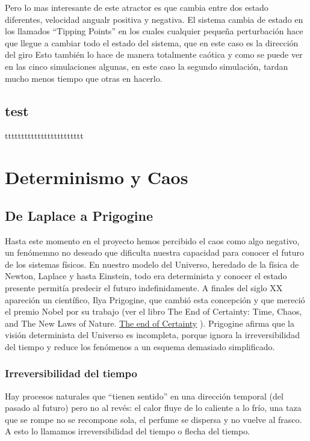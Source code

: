 \documentclass[
  11pt,
  a4paper,
  DIV=11,
  numbers=noendperiod]{scrreprt}
\begin{document}
Pero lo mas interesante de este atractor es que cambia entre dos estado
diferentes, velocidad angualr positiva y negativa. El sistema cambia de
estado en los llamados ``Tipping Points'' en los cuales cualquier
pequeña perturbación hace que llegue a cambiar todo el estado del
sistema, que en este caso es la dirección del giro Esto también lo hace
de manera totalmente caótica y como se puede ver en las cinco
simulaciones algunas, en este caso la segundo simulación, tardan mucho
menos tiempo que otras en hacerlo.

\chapter{test}\label{test}

tttttttttttttttttttttttt

\part{Determinismo y Caos}

\chapter{De Laplace a Prigogine}\label{de-laplace-a-prigogine}

Hasta este momento en el proyecto hemos percibido el caos como algo
negativo, un fenómemno no deseado que dificulta nuestra capacidad para
conocer el futuro de los sistemas físicos. En nuestro modelo del
Universo, heredado de la física de Newton, Laplace y hasta Einstein,
todo era determinista y conocer el estado presente permitía predecir el
futuro indefinidamente. A finales del siglo XX apareción un científico,
Ilya Prigogine, que cambió esta concepción y que mereció el premio Nobel
por su trabajo (ver el libro The End of Certainty: Time, Chaos, and The
New Laws of Nature.
\href{https://kremesti.com/portfolio/technical_writing/Academic_Research_Papers/End_of_Certainty.htm}{The
end of Certainty} ). Prigogine afirma que la visión determinista del
Universo es incompleta, porque ignora la irreversibilidad del tiempo y
reduce los fenómenos a un esquema demasiado simplificado.

\section{Irreversibilidad del tiempo}\label{irreversibilidad-del-tiempo}

Hay procesos naturales que ``tienen sentido'' en una dirección temporal
(del pasado al futuro) pero no al revés: el calor fluye de lo caliente a
lo frío, una taza que se rompe no se recompone sola, el perfume se
dispersa y no vuelve al frasco. A esto lo llamamos irreversibilidad del
tiempo o flecha del tiempo.
\end{document}
